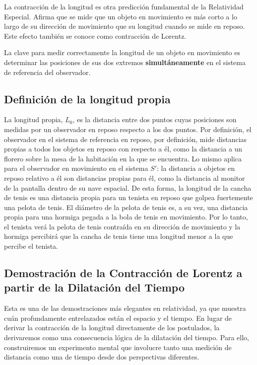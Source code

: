 \documentclass[11pt,a4paper]{book}
\begin{document}
La contracción de la longitud es otra predicción fundamental de la Relatividad Especial. Afirma que se mide que un objeto en movimiento es más corto a lo largo de su dirección de movimiento que su longitud cuando se mide en reposo. Este efecto también se conoce como contracción de Lorentz.

La clave para medir correctamente la longitud de un objeto en movimiento es determinar las posiciones de sus dos extremos \textbf{simultáneamente} en el sistema de referencia del observador.

\subsection{Definición de la longitud propia}
La longitud propia, $L_0$, es la distancia entre dos puntos cuyas posiciones son medidas por un observador en reposo respecto a los dos puntos. Por definición, el observador en el sistema de referencia en reposo, por definición, mide distancias propias a todos los objetos en reposo con respecto a él, como la distancia a un florero sobre la mesa de la habitación en la que se encuentra. Lo mismo aplica para el observador en movimiento en el sistema $S'$: la distancia a objetos en reposo relativo a él son distancias propias para él, como la distancia al monitor de la pantalla dentro de su nave espacial. De esta forma, la longitud de la cancha de tenis es una distancia propia para un tenista en reposo que golpea fuertemente una pelota de tenis. El diámetro de la pelota de tenis es, a su vez, una distancia propia para una hormiga pegada a la bola de tenis en movimiento. Por lo tanto, el tenista verá la pelota de tenis contraída en su dirección de movimiento y la hormiga percibirá que la cancha de tenis tiene una longitud menor a la que percibe el tenista. 


\subsection*{Demostración de la Contracción de Lorentz a partir de la Dilatación del Tiempo}

Esta es una de las demostraciones más elegantes en relatividad, ya que muestra cuán profundamente entrelazados están el espacio y el tiempo. En lugar de derivar la contracción de la longitud directamente de los postulados, la derivaremos como una consecuencia lógica de la dilatación del tiempo. Para ello, construiremos un experimento mental que involucre tanto una medición de distancia como una de tiempo desde dos perspectivas diferentes.
\end{document}

